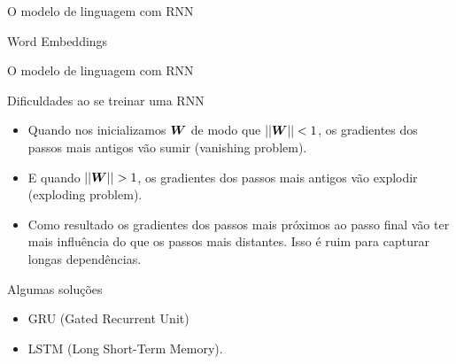 \documentclass[10pt]{beamer}
\begin{document}
\begin{frame}{O modelo de linguagem com RNN}

\end{frame}

\begin{frame}{Word Embeddings}

\end{frame}


\begin{frame}{O modelo de linguagem com RNN}

\end{frame}

\begin{frame}{Dificuldades ao se treinar uma RNN}

\begin{itemize}
\item Quando nos inicializamos $\bm{W}$ de modo que $||\bm{W}|| < 1$, os gradientes dos passos mais antigos vão sumir (\alert{vanishing problem}).
\vspace{0.2cm}
\item E quando $||\bm{W}|| > 1$, os gradientes dos passos mais antigos vão explodir (\alert{exploding problem}).
\vspace{0.2cm}
\item Como resultado os gradientes dos passos mais próximos ao passo final vão ter mais influência do que os passos mais distantes. Isso é ruim para capturar \alert{longas dependências}.
\vspace{0.2cm}
\begin{itemize}
 
\vspace{0.3cm}
 
\vspace{0.3cm}
 
\end{itemize}
\end{itemize}
\end{frame}

\begin{frame}{Algumas soluções}
\begin{itemize}
\item GRU (Gated Recurrent Unit)
\vspace{0.2cm}
\item LSTM (Long Short-Term Memory).
\end{itemize}
\vspace{0.2cm}

\end{frame}
\end{document}
